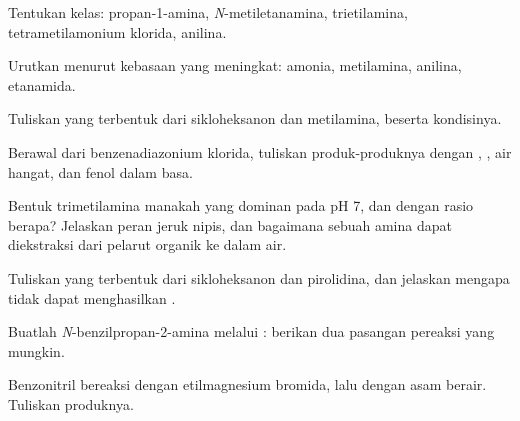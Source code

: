 \begin{exercise}[$\star$]\label{exo:b2:amines:1}
Tentukan kelas: propan-1-amina, \textit{N}-metiletanamina, trietilamina,
tetrametilamonium klorida, anilina.
\end{exercise}

\begin{exercise}[$\star$]\label{exo:b2:amines:2}
Urutkan menurut kebasaan yang meningkat: amonia, metilamina, anilina, etanamida.
\end{exercise}

\begin{exercise}[$\star$]\label{exo:b2:amines:3}
Tuliskan  yang terbentuk dari sikloheksanon dan metilamina, beserta kondisinya.
\end{exercise}

\begin{exercise}[$\star$]\label{exo:b2:amines:4}
Berawal dari benzenadiazonium klorida, tuliskan produk-produknya dengan
, , air hangat, dan fenol dalam basa.
\end{exercise}

\begin{exercise}[$\star\star$]\label{exo:b2:amines:5}
Bentuk trimetilamina manakah yang dominan pada pH 7, dan dengan rasio
berapa? Jelaskan peran jeruk nipis, dan bagaimana sebuah amina dapat
diekstraksi dari pelarut organik ke dalam air.
\end{exercise}

\begin{exercise}[$\star\star$]\label{exo:b2:amines:6}
Tuliskan  yang terbentuk dari sikloheksanon dan pirolidina, dan
jelaskan mengapa  tidak dapat menghasilkan .
\end{exercise}

\begin{exercise}[$\star\star$]\label{exo:b2:amines:7}
Buatlah \textit{N}-benzilpropan-2-amina  melalui
: berikan dua pasangan pereaksi yang mungkin.
\end{exercise}

\begin{exercise}[$\star\star$]\label{exo:b2:amines:8}
Benzonitril bereaksi dengan etilmagnesium bromida, lalu dengan asam berair. Tuliskan produknya.
\end{exercise}

